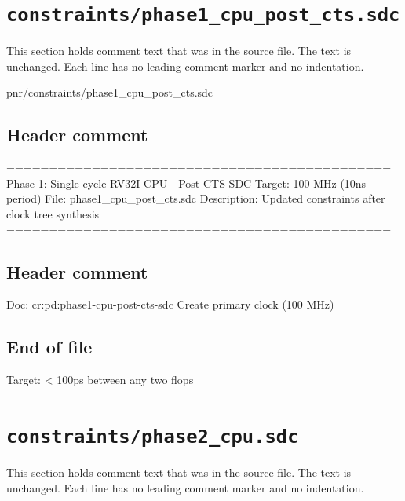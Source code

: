 \section{\texttt{constraints/phase1\_cpu\_post\_cts.sdc}}\label{tm:pd:phase1-cpu-post-cts-sdc}

This section holds comment text that was in the source file. The text is unchanged. Each line has no leading comment marker and no indentation.

\begin{relocated}{pnr/constraints/phase1_cpu_post_cts.sdc}

\subsection*{Header comment}

\begin{textblock}
=============================================
Phase 1: Single-cycle RV32I CPU - Post-CTS SDC
Target: 100 MHz (10ns period)
File: phase1_cpu_post_cts.sdc
Description: Updated constraints after clock tree synthesis
=============================================
\end{textblock}

\subsection*{Header comment}

\begin{textblock}
Doc: cr:pd:phase1-cpu-post-cts-sdc
Create primary clock (100 MHz)
\end{textblock}

\subsection*{End of file}

\begin{textblock}
Target: < 100ps between any two flops
\end{textblock}

\end{relocated}

\section{\texttt{constraints/phase2\_cpu.sdc}}\label{tm:pd:phase2-cpu-sdc}

This section holds comment text that was in the source file. The text is unchanged. Each line has no leading comment marker and no indentation.

